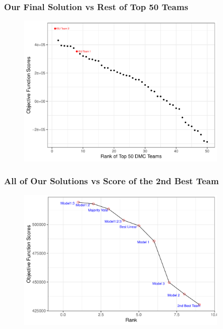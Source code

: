 \documentclass{beamer}
\begin{document}
\begin{frame}
\frametitle{Our Final Solution vs Rest of Top 50 Teams}

	\begin{figure}[H]
		\centering
		\includegraphics[width = 0.9\textwidth]{figure/rank_top_50.pdf}
	\end{figure}	

\end{frame}



\begin{frame}
\frametitle{All of Our Solutions vs Score of the 2nd Best Team}

	\begin{figure}[H]
		\centering
		\includegraphics[width = 0.9\textwidth]{figure/rank_our_models.pdf}
	\end{figure}	

\end{frame}
\end{document}
